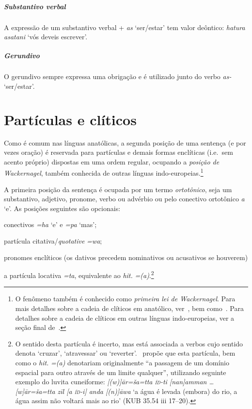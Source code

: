 \paragraph{Substantivo verbal}
A expressão de um substantivo verbal + \emph{as} `ser\slash{}estar' tem valor
deôntico: \emph{hatura asatani} `vós deveis escrever'.

\paragraph{Gerundivo}
O gerundivo sempre expressa uma obrigação e é utilizado junto do verbo \emph{as-} `ser\slash{}estar'.


\chapter{Partículas e clíticos}

Como é comum nas línguas anatólicas, a segunda posição de uma sentença (e por
vezes oração) é reservada para partículas e demais formas enclíticas  (i.e.\ sem
acento próprio) dispostas em uma ordem regular, ocupando a \emph{posição de Wackernagel}, também conhecida de
outras línguas indo-europeias.\footnote{O fenômeno também é conhecido como
	\emph{primeira lei de Wackernagel}. Para mais detalhes sobre a cadeia de
	clíticos em anatólico, ver~, bem
	como~\citet{Garret1989,Garret1990,AgbayaniGolston2012}.
	Para detalhes sobre a cadeia de clíticos em outras línguas indo-europeias,
	ver a seção final de~\citet{WackernagelsLawI}.
}

A primeira posição da sentença é ocupada por um termo \emph{ortotônico},
seja um substantivo, adjetivo, pronome, verbo ou advérbio ou pelo conectivo
ortotônico \emph{a} `e'.
As posições seguintes são opcionais:
\begin{inparaenum}
	\item[2.] conectivos \emph{=ha} `e' e \emph{=pa} `mas';
	\item[3.] partícula citativa\slash{}\emph{quotative} \emph{=wa};
	\item[4.] pronomes enclíticos (os dativos precedem nominativos ou acusativos
	se houverem)
	\item[5.] a partícula locativa \emph{=ta}, equivalente ao \emph{hit.}
	\emph{={(a)}}.\footnote{O sentido desta partícula é
	incerto, mas está associada a verbos cujo sentido denota `cruzar',
	`atravessar' ou `reverter'.~\citet[419]{Josephson1972} propõe que esta partícula,
	bem como o \emph{hit.} \emph{={(a)}} denotariam originalmente
	``a passagem de um domínio espacial para outro através de um limite
	qualquer'', utilizando seguinte exemplo do luvita cuneiforme:
	\emph{[(w)]ār=ša=tta \textsc{íd}-ti [nan]amman \ldots{} [w]ār=ša=tta zīl [a
	\textsc{íd}-i] anda [(n)]āwa} `a água é levada (embora) do rio, a água assim
	não voltará mais ao rio' (KUB 35.54 iii 17–20).
	}
\end{inparaenum}

